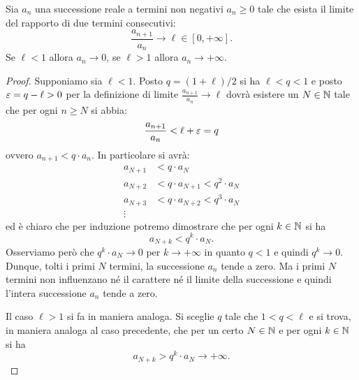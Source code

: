 \begin{theorem}
\label{th:criterio_rapporto}
  Sia $a_n$ una successione reale a termini non negativi
  $a_n \ge 0$ tale che esista il limite del rapporto di due termini consecutivi:
  \[
     \frac{a_{n+1}}{a_n} \to \ell \in [0,+\infty].
  \]
  Se $\ell < 1$ allora $a_n \to 0$, se $\ell >1$ allora $a_n \to +\infty$.
\end{theorem}
%
%
%

\begin{proof}
Supponiamo sia $\ell<1$. Posto $q=(1+\ell)/2$ si ha $\ell < q < 1$ 
e posto $\varepsilon=q-\ell>0$ per la definizione di limite $\frac{a_{n+1}}{a_n}\to \ell$ 
dovrà esistere un $N\in {\mathbb N}$ tale
che per ogni $n\ge N$ si abbia:
\[
  \frac{a_{n+1}}{a_n} < \ell + \varepsilon = q
\]
ovvero $a_{n+1} < q \cdot a_n$. In particolare si avrà:
\begin{align*}
  a_{N+1} &< q \cdot a_N \\
  a_{N+2} &< q \cdot a_{N+1} < q^2\cdot a_N \\
  a_{N+3} &< q \cdot a_{N+2} < q^3\cdot a_N \\
  \vdots
\end{align*}
ed è chiaro che per induzione potremo dimostrare che per
ogni $k\in {\mathbb N}$ si ha
\[
  a_{N+k} < q^k\cdot a_N.
\]
Osserviamo però che $q^k \cdot a_N \to 0$ per $k\to +\infty$
in quanto $q<1$ e quindi $q^k \to 0$. 
Dunque, tolti i primi $N$ termini, la successione $a_n$ tende a zero. 
Ma i primi $N$ termini non influenzano né il carattere né il limite 
della successione e quindi l'intera successione $a_n$ tende a zero.

Il caso $\ell>1$ si fa in maniera analoga. Si sceglie $q$ tale
che $1<q<\ell$ e si trova, in maniera analoga al caso precedente,
che per un certo $N\in {\mathbb N}$ e per ogni $k\in {\mathbb N}$ si ha
\[
  a_{N+k} > q^k \cdot a_N \to +\infty.
\]
\end{proof}

